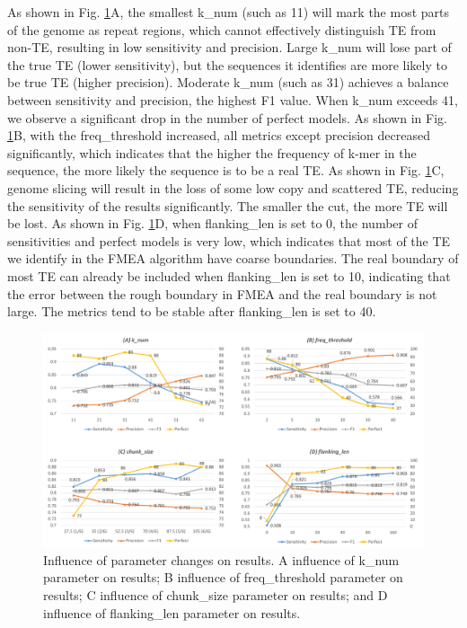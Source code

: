 \documentclass{bmcart}
\begin{document}
As shown in Fig. \ref{fig:param_results}A, the smallest k\_num (such as 11) will mark the most parts of the genome as repeat regions, which cannot effectively distinguish TE from non-TE, resulting in low sensitivity and precision. Large k\_num will lose part of the true TE (lower sensitivity), but the sequences it identifies are more likely to be true TE (higher precision). Moderate k\_num (such as 31) achieves a balance between sensitivity and precision, the highest F1 value. When k\_num exceeds 41, we observe a significant drop in the number of perfect models. 
As shown in Fig. \ref{fig:param_results}B, with the freq\_threshold increased, all metrics except precision decreased significantly, which indicates that the higher the frequency of k-mer in the sequence, the more likely the sequence is to be a real TE.
As shown in Fig. \ref{fig:param_results}C, genome slicing will result in the loss of some low copy and scattered TE, reducing the sensitivity of the results significantly. The smaller the cut, the more TE will be lost.
As shown in Fig. \ref{fig:param_results}D, when flanking\_len is set to 0, the number of sensitivities and perfect models is very low, which indicates that most of the TE we identify in the FMEA algorithm have coarse boundaries. The real boundary of most TE can already be included when flanking\_len is set to 10, indicating that the error between the rough boundary in FMEA and the real boundary is not large. The metrics tend to be stable after flanking\_len is set to 40.


\begin{figure}[h!]
	\centerline{\includegraphics[width=1.0\textwidth]{figures/ParamResults.pdf}}
	\caption{Influence of parameter changes on results. A influence of k\_num parameter on results; B influence of freq\_threshold parameter on results; C influence of chunk\_size parameter on results; and D influence of flanking\_len parameter on results.}
	\label{fig:param_results}
\end{figure}
\end{document}
